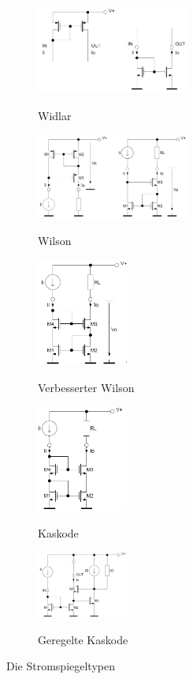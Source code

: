 \begin{figure}[h]
	\centering
	\begin{subfigure}[b]{5cm}
		\centering
		{\includegraphics[width=5cm]{images/stromspiegel/widlar.png}}
		\caption{Widlar}
	\end{subfigure} \qquad	
	\begin{subfigure}[b]{5cm}
		\centering
		{\includegraphics[width=5cm]{images/stromspiegel/wilson.png}}
		\caption{Wilson}
	\end{subfigure}
	
	\begin{subfigure}[b]{5cm}
		\centering
		{\includegraphics[width=3cm]{images/stromspiegel/verbesserter_wilson.png}}
		\caption{Verbesserter Wilson}
	\end{subfigure} \qquad	
	\begin{subfigure}[b]{3cm}
		\centering
		{\includegraphics[width=3cm]{images/stromspiegel/kaskode.png}}
		\caption{Kaskode}
	\end{subfigure} \qquad	
	\begin{subfigure}[b]{3cm}
		\centering
		{\includegraphics[width=3cm]{images/stromspiegel/geregelte_kaskode.png}}
		\caption{Geregelte Kaskode}
	\end{subfigure} 

	\caption{Die Stromspiegeltypen}
	\label{fig:stromspiegeltypen}
\end{figure}